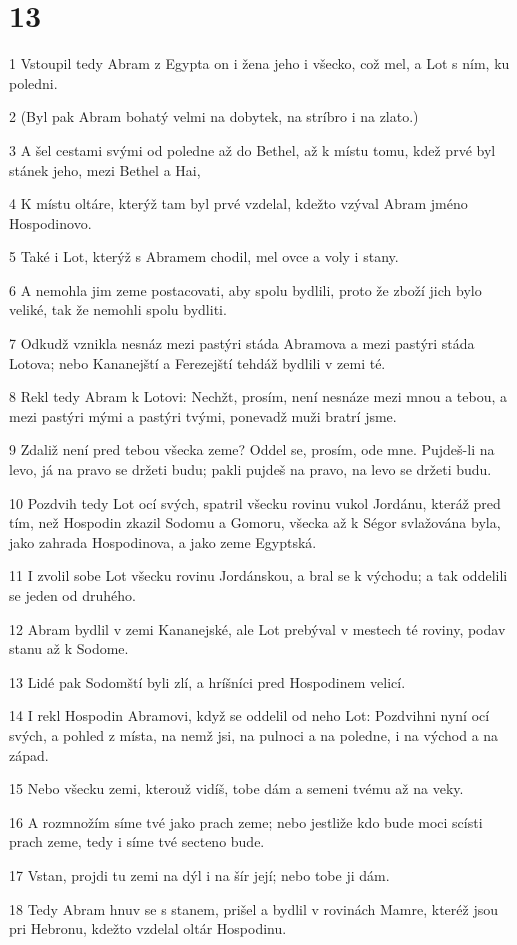 \chapter{13}

\par 1 Vstoupil tedy Abram z Egypta on i žena jeho i všecko, což mel, a Lot s ním, ku poledni.
\par 2 (Byl pak Abram bohatý velmi na dobytek, na stríbro i na zlato.)
\par 3 A šel cestami svými od poledne až do Bethel, až k místu tomu, kdež prvé byl stánek jeho, mezi Bethel a Hai,
\par 4 K místu oltáre, kterýž tam byl prvé vzdelal, kdežto vzýval Abram jméno Hospodinovo.
\par 5 Také i Lot, kterýž s Abramem chodil, mel ovce a voly i stany.
\par 6 A nemohla jim zeme postacovati, aby spolu bydlili, proto že zboží jich bylo veliké, tak že nemohli spolu bydliti.
\par 7 Odkudž vznikla nesnáz mezi pastýri stáda Abramova a mezi pastýri stáda Lotova; nebo Kananejští a Ferezejští tehdáž bydlili v zemi té.
\par 8 Rekl tedy Abram k Lotovi: Nechžt, prosím, není nesnáze mezi mnou a tebou, a mezi pastýri mými a pastýri tvými, ponevadž muži bratrí jsme.
\par 9 Zdaliž není pred tebou všecka zeme? Oddel se, prosím, ode mne. Pujdeš-li na levo, já na pravo se držeti budu; pakli pujdeš na pravo, na levo se držeti budu.
\par 10 Pozdvih tedy Lot ocí svých, spatril všecku rovinu vukol Jordánu, kteráž pred tím, než Hospodin zkazil Sodomu a Gomoru, všecka až k Ségor svlažována byla, jako zahrada Hospodinova, a jako zeme Egyptská.
\par 11 I zvolil sobe Lot všecku rovinu Jordánskou, a bral se k východu; a tak oddelili se jeden od druhého.
\par 12 Abram bydlil v zemi Kananejské, ale Lot prebýval v mestech té roviny, podav stanu až k Sodome.
\par 13 Lidé pak Sodomští byli zlí, a hríšníci pred Hospodinem velicí.
\par 14 I rekl Hospodin Abramovi, když se oddelil od neho Lot: Pozdvihni nyní ocí svých, a pohled z místa, na nemž jsi, na pulnoci a na poledne, i na východ a na západ.
\par 15 Nebo všecku zemi, kterouž vidíš, tobe dám a semeni tvému až na veky.
\par 16 A rozmnožím síme tvé jako prach zeme; nebo jestliže kdo bude moci scísti prach zeme, tedy i síme tvé secteno bude.
\par 17 Vstan, projdi tu zemi na dýl i na šír její; nebo tobe ji dám.
\par 18 Tedy Abram hnuv se s stanem, prišel a bydlil v rovinách Mamre, kteréž jsou pri Hebronu, kdežto vzdelal oltár Hospodinu.

